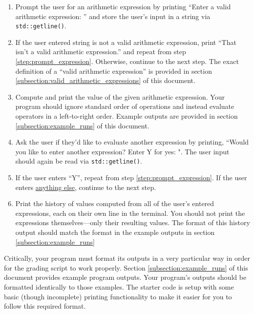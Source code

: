 \documentclass{article}
\begin{document}
\begin{enumerate}
    \item \label{step:prompt_expression} Prompt the user for an arithmetic expression by printing ``Enter a valid arithmetic expression: '' and store the user's input in a string via \texttt{std::getline()}.
    \item If the user entered string is not a valid arithmetic expression, print ``That isn't a valid arithmetic expression.'' and repeat from step \ref{step:prompt_expression}. Otherwise, continue to the next step. The exact definition of a ``valid arithmetic expression'' is provided in section \ref{subsection:valid_arithmetic_expressions} of this document.
    \item Compute and print the value of the given arithmetic expression. Your program should ignore standard order of operations and instead evaluate operators in a left-to-right order. Example outputs are provided in section \ref{subsection:example_runs} of this document.
    \item Ask the user if they'd like to evaluate another expression by printing, ``Would you like to enter another expression? Enter Y for yes: ". The user input should again be read via \texttt{std::getline()}.
    \item If the user enters ``Y'', repeat from step \ref{step:prompt_expression}. If the user enters \ul{anything else}, continue to the next step.
    \item Print the history of values computed from all of the user's entered expressions, each on their own line in the terminal. You should not print the expressions themselves---only their resulting values. The format of this history output should match the format in the example outputs in section \ref{subsection:example_runs}
\end{enumerate}

Critically, your program must format its outputs in a very particular way in order for the grading script to work properly. Section \ref{subsection:example_runs} of this document provides example program outputs. Your program's outputs should be formatted identically to those examples. The starter code is setup with some basic (though incomplete) printing functionality to make it easier for you to follow this required format.
\end{document}
